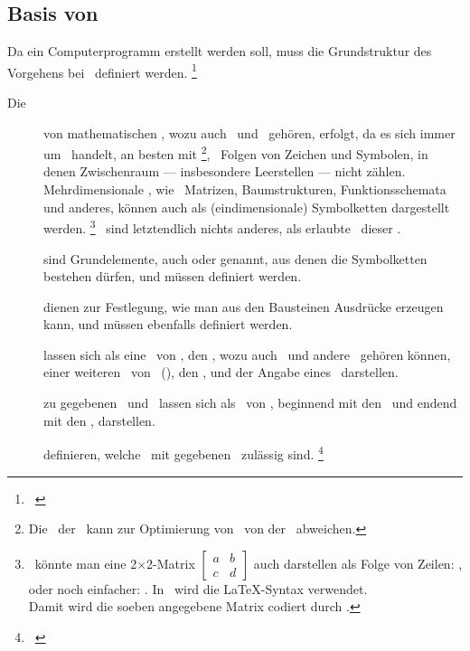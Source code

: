 \begin{offen}%

\section[Basis von Beweisen]{Basis von \Beweisen}%
\label                             {sec:BeweisBasis}

Da ein Computerprogramm erstellt werden soll, muss die Grundstruktur des Vorgehens bei \Beweisen\ definiert werden.%
\footnote{\seename~\cite{bib:Kalkuel}}

\begin{description}
	\item[Die \logischeDarstellung] von mathematischen \Aussagen, wozu auch \Axiome\ und \Saetze\ gehören, erfolgt, da es sich immer um \Formeln\ handelt, an besten mit \Symbolketten%
	\footnote{%
		Die \interneDarstellung\ der \Symbolketten\ kann zur Optimierung von \ASBA\ von der \logischenD\ abweichen.
	},
	\textdh\ Folgen von Zeichen und Symbolen, in denen Zwischenraum --- insbesondere Leerstellen --- nicht zählen.
	Mehrdimensionale \Formeln, wie \textzB\ Matrizen, Baumstrukturen, Funktionsschemata und anderes, können auch als (eindimensionale) Symbolketten dargestellt werden.%
	\footnote{%
		\textZB\ könnte man eine 2$\times$2-Matrix
		$\begin{bmatrix} a & b \\ c & d \end{bmatrix}$
		auch darstellen als Folge von Zeilen: \seqqt{$[(a,b),(c,d)]$}, oder noch einfacher: \seqqt{$[a,b;c,d]$}.
		In \ASBA\ wird die \LaTeX-Syntax verwendet.
		\\Damit wird die soeben angegebene Matrix codiert durch .
	}
	\Beweise\ sind letztendlich nichts anderes, als erlaubte \Transformationen\ dieser \Symbolketten.
	\item[\Bausteine] sind Grundelemente, auch  oder  genannt, aus denen die Symbolketten bestehen dürfen, und müssen definiert werden.
	\item[\Formationsregeln] dienen zur Festlegung, wie man aus den Bausteinen Ausdrücke erzeugen kann, und müssen ebenfalls definiert werden.
	\item[\Saetze] lassen sich als eine \Menge\ von \Formeln, den \Praemissen, wozu auch \Axiome\ und andere \Saetze\ gehören können, einer weiteren \Menge\ von \Formeln\ (\Symbolketten), den \Konklusionen, und der Angabe eines \Beweises\ darstellen.
	\item[\Beweise] zu gegebenen \Praemissen\ und \Konklusionen\ lassen sich als \Folge\ von \Transformationen, beginnend mit den \Praemissen\ und endend mit den \Konklusionen, darstellen.
	\item[\Transformationsregeln] definieren, welche \Transformationen\ mit gegebenen \Formelmengen\ zulässig sind.%
	\footnote{\seename~\cite{bib:Rautenberg,bib:Schlussregel,bib:NatuerlichesSchliessen}}
\end{description}

\end{offen}%

\Endchapter
